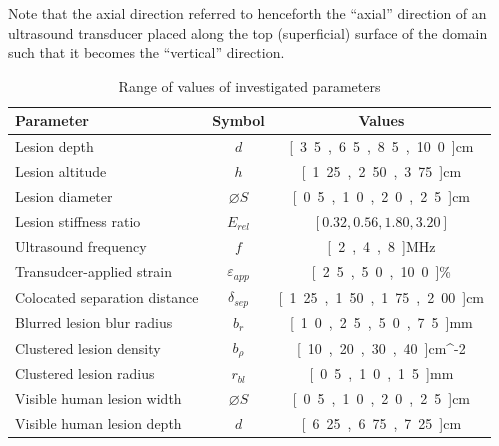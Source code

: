 		Note that the axial direction referred to henceforth  the ``axial'' direction of an ultrasound transducer placed along the top (superficial) surface of the domain such that it becomes the ``vertical'' direction.

		\begin{table}[!t]
			\centering
			\caption{Range of values of investigated parameters}
			\label{tab:parametervalues}
			\begin{tabular}{lcc}
				\toprule
				Parameter & Symbol & Values \\
				\midrule
				Lesion depth & $d$ & \unit{[3.5, 6.5, 8.5, 10.0]}{cm} \\
				Lesion altitude & $h$ & \unit{[1.25, 2.50, 3.75]}{cm} \\
				Lesion diameter & $\diameter S$ & \unit{[0.5, 1.0, 2.0, 2.5]}{cm} \\
				Lesion stiffness ratio & $E_{rel}$ & $[0.32, 0.56, 1.80, 3.20]$ \\
				Ultrasound frequency & $f$ & \unit{[2, 4, 8]}{MHz} \\
				Transudcer-applied strain & $\varepsilon_{app}$ & \unit{[2.5, 5.0, 10.0]}{\%} \\
				Colocated separation distance & $\delta_{sep}$ & \unit{[1.25, 1.50, 1.75, 2.00]}{cm} \\
				Blurred lesion blur radius & $b_r$ & \unit{[1.0, 2.5, 5.0, 7.5]}{mm} \\
				Clustered lesion density & $b_\rho$ & \unit{[10, 20, 30, 40]}{cm^{-2}} \\
				Clustered lesion radius & $r_{bl}$ & \unit{[0.5, 1.0, 1.5]}{mm} \\
				Visible human lesion width & $\diameter S$ & \unit{[0.5, 1.0, 2.0, 2.5]}{cm} \\
				Visible human lesion depth & $d$ & \unit{[6.25, 6.75, 7.25]}{cm} \\
				\bottomrule
			\end{tabular}
		\end{table}


